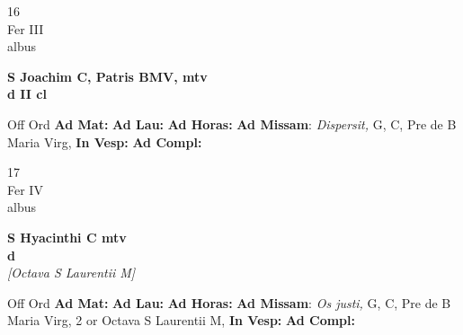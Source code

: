 \documentclass[10pt, openany]{book}
\begin{document}
        \begin{center}
            \begin{minipage}{3.5in}
                \vspace{2em}
                \begin{minipage}{0.5in}
                    {\Huge 16} \\
                    {\normalsize Fer III} \\
                    {\normalsize albus}
                \end{minipage}
                \begin{minipage}{3.0in}
                    \textbf{ \large S Joachim C, Patris BMV, mtv \\
                    \textnormal{\normalsize d II cl}} \\ 
                \end{minipage}
                \begin{justify}Off Ord
                    \textbf{Ad Mat: }
                    \textbf{Ad Lau: }
                    \textbf{Ad Horas: }\textbf{Ad Missam}: \textit{Dispersit,} G, C, Pre de B Maria Virg,  
                    \textbf{In Vesp: }
                    \textbf{Ad Compl: }
                \end{justify}
            \end{minipage}
        \end{center}
    
        \begin{center}
            \begin{minipage}{3.5in}
                \vspace{2em}
                \begin{minipage}{0.5in}
                    {\Huge 17} \\
                    {\normalsize Fer IV} \\
                    {\normalsize albus}
                \end{minipage}
                \begin{minipage}{3.0in}
                    \textbf{ \large S Hyacinthi C mtv \\
                    \textnormal{\normalsize d}} \\ \textit{[Octava S Laurentii M]} \\ 
                \end{minipage}
                \begin{justify}Off Ord
                    \textbf{Ad Mat: }
                    \textbf{Ad Lau: }
                    \textbf{Ad Horas: }\textbf{Ad Missam}: \textit{Os justi,} G, C, Pre de B Maria Virg, 2 or Octava S Laurentii M,  
                    \textbf{In Vesp: }
                    \textbf{Ad Compl: }
                \end{justify}
            \end{minipage}
        \end{center}
    
\end{document}
